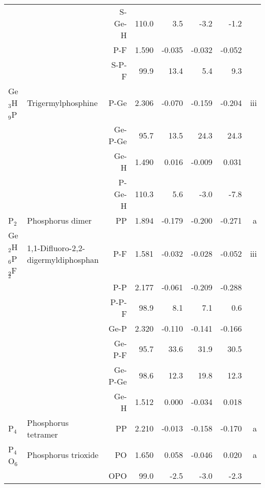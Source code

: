 \begin{table}
\begin{center}
\begin{tabular}{llrrrrrr}
             &                                    &S-Ge-H       &     110.0   &       3.5 &      -3.2 &      -1.2   &       \\
             &                                    &P-F            &     1.590   &    -0.035 &    -0.032 &    -0.052 &       \\
             &                                    &S-P-F        &      99.9   &      13.4 &       5.4 &       9.3   &       \\
 Ge$_3$H$_9$P      & Trigermylphosphine                 &P-Ge           &     2.306   &    -0.070 &    -0.159 &    -0.204 &   iii \\
             &                                    &Ge-P-Ge      &      95.7   &      13.5 &      24.3 &      24.3   &       \\
             &                                    &Ge-H           &     1.490   &     0.016 &    -0.009 &     0.031 &       \\
             &                                    &P-Ge-H       &     110.3   &       5.6 &      -3.0 &      -7.8   &       \\
 P$_2$          & Phosphorus dimer                   &PP             &     1.894   &    -0.179 &    -0.200 &    -0.271 &     a \\
 Ge$_2$H$_6$P$_2$F$_2$   & 1,1-Difluoro-2,2-digermyldiphosphan&P-F            &     1.581   &    -0.032 &    -0.028 &    -0.052 &   iii \\
             &                                    &P-P            &     2.177   &    -0.061 &    -0.209 &    -0.288 &       \\
             &                                    &P-P-F        &      98.9   &       8.1 &       7.1 &       0.6   &       \\
             &                                    &Ge-P           &     2.320   &    -0.110 &    -0.141 &    -0.166 &       \\
             &                                    &Ge-P-F       &      95.7   &      33.6 &      31.9 &      30.5   &       \\
             &                                    &Ge-P-Ge      &      98.6   &      12.3 &      19.8 &      12.3   &       \\
             &                                    &Ge-H           &     1.512   &     0.000 &    -0.034 &     0.018 &       \\
 P$_4$          & Phosphorus tetramer                &PP             &     2.210   &    -0.013 &    -0.158 &    -0.170 &     a \\
 P$_4$O$_6$        & Phosphorus trioxide                &PO             &     1.650   &     0.058 &    -0.046 &     0.020 &     a \\
             &                                    &OPO          &      99.0   &      -2.5 &      -3.0 &      -2.3   &       \\
\hline
\end{tabular}
\end{center}
\end{table}
\clearpage

